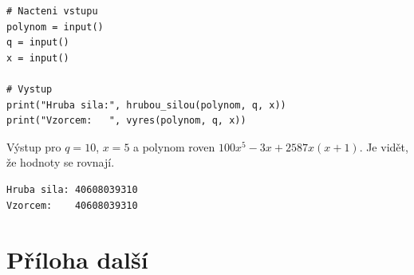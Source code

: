 \documentclass[12pt]{report}			%
\begin{document}
\begin{appendices}
\begin{lstlisting}[title={Generator.py}, caption={generator.py}, label={lst:hello_world}]
# Nacteni vstupu
polynom = input()
q = input()
x = input()

# Vystup
print("Hruba sila:", hrubou_silou(polynom, q, x))
print("Vzorcem:   ", vyres(polynom, q, x))

\end{lstlisting}

Výstup pro $q=10$, $x=5$ a polynom roven $100x^5 - 3x + 2587x(x + 1)$. Je vidět, že hodnoty se rovnají.
\begin{lstlisting}[numbers=none, title={Výstup našeho programu}]
Hruba sila: 40608039310
Vzorcem:    40608039310
\end{lstlisting}
	\chapter{Příloha další }
	\end{appendices}
\end{document}
